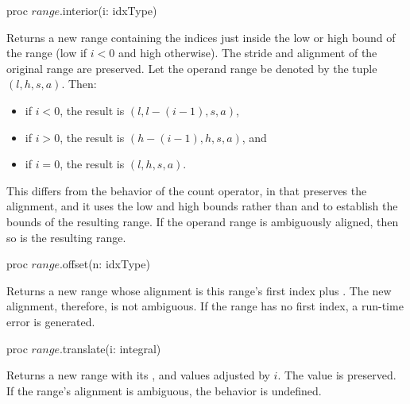 \begin{protohead}
proc $range$.interior(i: idxType)
\end{protohead}
\begin{protobody}
Returns a new range containing the indices just inside the low or high bound of
the range (low if $i < 0$ and high otherwise).  The stride and alignment of the
original range are preserved.  Let the operand range
be denoted by the tuple $(l,h,s,a)$.  Then:
\begin{itemize}
\item[] if $i < 0$, the result is $(l,l-(i-1),s,a)$,
\item[] if $i > 0$, the result is $(h-(i-1),h,s,a)$, and
\item[] if $i = 0$, the result is $(l,h,s,a)$.
\end{itemize}
This differs from the behavior of the count operator, in that 
preserves the alignment, and it uses the low and high bounds rather
than  and  to establish the bounds of the resulting range.
If the operand range is ambiguously aligned, then so is the resulting range.
\end{protobody}

\begin{protohead}
proc $range$.offset(n: idxType)
\end{protohead}
\label{Range_Offset_Method}
\begin{protobody}
Returns a new range whose alignment is this range's first index plus
. The new alignment, therefore, is not ambiguous.
If the range has no first index, a run-time error is generated.
\end{protobody}

\begin{protohead}
proc $range$.translate(i: integral)
\end{protohead}
\begin{protobody}
Returns a new range with its ,  and  values
adjusted by $i$.  The  value is preserved.
If the range's alignment is ambiguous, the behavior is undefined.
\end{protobody}

